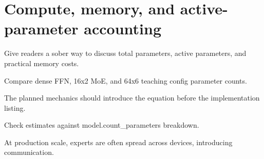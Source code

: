 \section{Compute, memory, and active-parameter accounting}
\label{sec:ch12-compute-memory-and-active-parameter-accounting}

Give readers a sober way to discuss total parameters, active parameters, and practical memory costs.



Compare dense FFN, 16x2 MoE, and 64x6 teaching config parameter counts.



The planned mechanics should introduce the equation before the implementation listing.





\begin{checkpointbox}
Check estimates against model.count\_parameters breakdown.
\end{checkpointbox}

At production scale, experts are often spread across devices, introducing communication.
